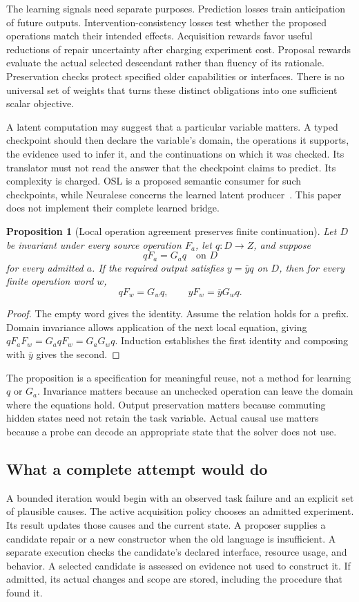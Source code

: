 \documentclass[11pt,letterpaper]{article}
\theoremstyle{plain}
\newtheorem{proposition}[theorem]{Proposition}
\theoremstyle{definition}
\begin{document}
The learning signals need separate purposes. Prediction losses train anticipation of future outputs. Intervention-consistency losses test whether the proposed operations match their intended effects. Acquisition rewards favor useful reductions of repair uncertainty after charging experiment cost. Proposal rewards evaluate the actual selected descendant rather than fluency of its rationale. Preservation checks protect specified older capabilities or interfaces. There is no universal set of weights that turns these distinct obligations into one sufficient scalar objective.

A latent computation may suggest that a particular variable matters. A typed checkpoint should then declare the variable's domain, the operations it supports, the evidence used to infer it, and the continuations on which it was checked. Its translator must not read the answer that the checkpoint claims to predict. Its complexity is charged. OSL is a proposed semantic consumer for such checkpoints, while Neuralese concerns the learned latent producer~\cite{osl,neuralese}. This paper does not implement their complete learned bridge.

\begin{proposition}[Local operation agreement preserves finite continuation]\label{prop:continuation}
Let $D$ be invariant under every source operation $F_a$, let $q:D\to Z$, and suppose
\[
qF_a=G_aq\quad\text{on }D
\]
for every admitted $a$. If the required output satisfies $y=\bar yq$ on $D$, then for every finite operation word $w$,
\[
qF_w=G_wq,\qquad yF_w=\bar yG_wq.
\]
\end{proposition}
\begin{proof}
The empty word gives the identity. Assume the relation holds for a prefix. Domain invariance allows application of the next local equation, giving $qF_aF_w=G_aqF_w=G_aG_wq$. Induction establishes the first identity and composing with $\bar y$ gives the second.
\end{proof}

The proposition is a specification for meaningful reuse, not a method for learning $q$ or $G_a$. Invariance matters because an unchecked operation can leave the domain where the equations hold. Output preservation matters because commuting hidden states need not retain the task variable. Actual causal use matters because a probe can decode an appropriate state that the solver does not use.

\subsection{What a complete attempt would do}
A bounded iteration would begin with an observed task failure and an explicit set of plausible causes. The active acquisition policy chooses an admitted experiment. Its result updates those causes and the current state. A proposer supplies a candidate repair or a new constructor when the old language is insufficient. A separate execution checks the candidate's declared interface, resource usage, and behavior. A selected candidate is assessed on evidence not used to construct it. If admitted, its actual changes and scope are stored, including the procedure that found it.
\end{document}
